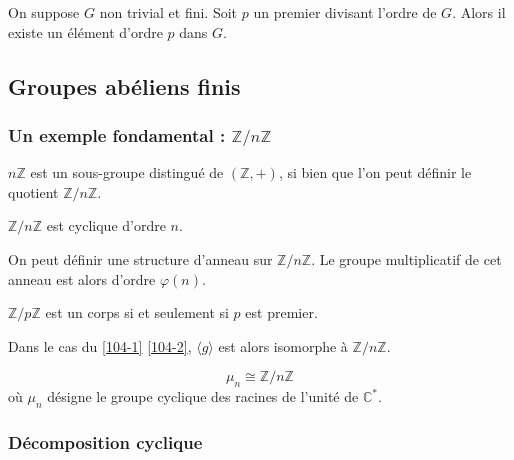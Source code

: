 	\begin{application}
		On suppose $G$ non trivial et fini. Soit $p$ un premier divisant l'ordre de $G$. Alors il existe un élément d'ordre $p$ dans $G$.
	\end{application}
	
	\newpage
	\subsection{Groupes abéliens finis}
	
	\subsubsection{Un exemple fondamental : \texorpdfstring{$\mathbb{Z}/n\mathbb{Z}$}{Z/nZ}}
	
	
	\begin{proposition}
		$n\mathbb{Z}$ est un sous-groupe distingué de $(\mathbb{Z}, +)$, si bien que l'on peut définir le quotient $\mathbb{Z}/n\mathbb{Z}$.
	\end{proposition}
	
	\begin{proposition}
		$\mathbb{Z}/n\mathbb{Z}$ est cyclique d'ordre $n$.
	\end{proposition}
	
	\begin{proposition}
		On peut définir une structure d'anneau sur $\mathbb{Z}/n\mathbb{Z}$. Le groupe multiplicatif de cet anneau est alors d'ordre $\varphi(n)$.
	\end{proposition}
	
	\begin{corollary}
		$\mathbb{Z}/p\mathbb{Z}$ est un corps si et seulement si $p$ est premier.
	\end{corollary}
	
	
	\begin{proposition}
		Dans le cas du \cref{104-1} \cref{104-2}, $\langle g \rangle$ est alors isomorphe à $\mathbb{Z}/n\mathbb{Z}$.
	\end{proposition}
	
	\begin{example}
		\[ \mu_n \cong \mathbb{Z}/n\mathbb{Z} \]
		où $\mu_n$ désigne le groupe cyclique des racines de l'unité de $\mathbb{C}^*$.
	\end{example}
	
	\subsubsection{Décomposition cyclique}
	
